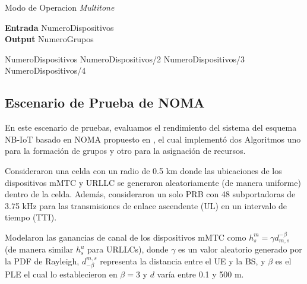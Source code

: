 \begin{algorithm}
    \caption{Modo de Operacion \textit{Multitone}}\label{euclid}
    \hspace*{\algorithmicindent} \textbf{Entrada} NumeroDispositivos\\
    \hspace*{\algorithmicindent} \textbf{Output} NumeroGrupos
    \begin{algorithmic}[1]
        \Return NumeroDispositivos
        \EndIf
        \Return NumeroDispositivos/2
        \EndIf
        \Return NumeroDispositivos/3
        \EndIf
        \Return NumeroDispositivos/4
        \EndIf
        \EndIf
    \EndIf
    \EndProcedure
    \end{algorithmic}
    \end{algorithm}

\subsection{Escenario de Prueba de NOMA}

En este escenario de pruebas, evaluamos el rendimiento del sistema del esquema NB-IoT basado en NOMA propuesto en \parencite{Shahini2019}, el cual implementó dos Algoritmos uno para la formación de grupos y otro para la asignación de recursos. \newline

Consideraron una celda con un radio de 0.5 km donde las ubicaciones de los dispositivos mMTC y URLLC se generaron aleatoriamente (de manera uniforme) dentro de la celda. Además, consideraron un solo PRB con 48 subportadoras de 3.75 kHz para las transmisiones de enlace ascendente (UL) en un intervalo de tiempo (TTI). \newline

Modelaron las ganancias de canal de los dispositivos mMTC como $h_{s}^{m} = \gamma d^{ -\beta}_{ m, s}$ (de manera similar $h_{s}^{u}$ para URLLCs), donde $\gamma$ es un valor aleatorio generado por la PDF de Rayleigh, $d_{-\beta}^{m,s}$ representa la distancia entre el UE y la BS, y $\beta$ es el PLE el cual lo establecieron en $\beta = 3$ y $d$ varía entre 0.1 y 500 m. \newline

